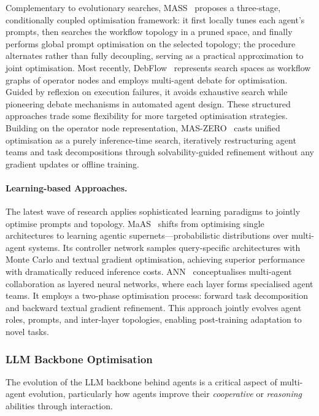 \documentclass[]{selfevolagent}
\theoremstyle{plain}
\theoremstyle{definition}
\theoremstyle{remark}
\begin{document}
Complementary to evolutionary searches, 
MASS~\citep{zhou2025multi} proposes a three-stage, conditionally coupled optimisation framework: it first locally tunes each agent’s prompts, then searches the workflow topology in a pruned space, and finally performs global prompt optimisation on the selected topology; the procedure alternates rather than fully decoupling, serving as a practical approximation to joint optimisation. 
Most recently, DebFlow~\citep{su2025debflowautomatingagentcreation} represents search spaces as workflow graphs of operator nodes and employs multi-agent debate for optimisation. Guided by reflexion on execution failures, it avoids exhaustive search while pioneering debate mechanisms in automated agent design. These structured approaches trade some flexibility for more targeted optimisation strategies. 
Building on the operator node representation, 
MAS-ZERO~\citep{ke2025maszerodesigningmultiagentsystems} casts unified optimisation as a purely inference-time search, iteratively restructuring agent teams and task decompositions through solvability-guided refinement without any gradient updates or offline training.

\paragraph{{Learning-based Approaches.}}
The latest wave of research applies sophisticated learning paradigms to jointly optimise prompts and topology. MaAS~\citep{zhang2025multiagentarchitecturesearchagentic} shifts from optimising single architectures to learning agentic supernets—probabilistic distributions over multi-agent systems. Its controller network samples query-specific architectures with Monte Carlo and textual gradient optimisation, achieving superior performance with dramatically reduced inference costs. ANN~\citep{ma2025agenticneuralnetworksselfevolving} conceptualises multi-agent collaboration as layered neural networks, where each layer forms specialised agent teams. It employs a two-phase optimisation process: forward task decomposition and backward textual gradient refinement. This approach jointly evolves agent roles, prompts, and inter-layer topologies, enabling post-training adaptation to novel tasks.


\subsubsection{LLM Backbone Optimisation} The evolution of the LLM backbone behind agents is a critical aspect of multi-agent evolution, particularly how agents improve their \textit{cooperative} or \textit{reasoning} abilities through interaction. 
\end{document}
